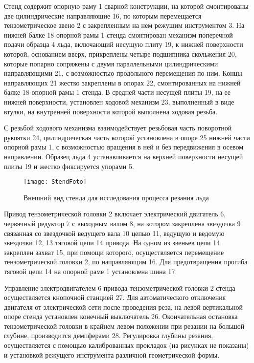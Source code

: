 Стенд содержит опорную раму 1 сварной конструкции, на которой смонтированы две цилиндрические направляющие 16, по которым перемещается тензометрическое звено 2 с закрепленным на нем режущим инструментом 3. На нижней балке 18 опорной рамы 1 стенда смонтирован механизм поперечной подачи образца 4 льда, включающий несущую плиту 19, к нижней поверхности которой, основанием вверх, прикреплены четыре подшипника скольжения 20, которые попарно сопряжены с двумя параллельными цилиндрическими направляющими 21, с возможностью продольного перемещения по ним. Концы направляющих 21 жестко закреплены в опорах 22, смонтированных на нижней балке 18 опорной рамы 1 стенда. В средней части несущей плиты 19, на ее нижней поверхности, установлен ходовой механизм 23, выполненный в виде втулки, на внутренней поверхности которой выполнена ходовая резьба.
 
С резьбой ходового механизма взаимодействует резьбовая часть поворотной рукоятки 24, цилиндрическая часть которой установлена в опоре 25 нижней части опорной рамы 1, с возможностью вращения в ней и без передвижения в осевом направлении. Образец льда 4 устанавливается на верхней поверхности несущей плиты 19 и жестко фиксируется упорами 5.

\begin{figure} [h]
	\center
	\texttt{[image: StendFoto]}
	\caption{Внешний вид стенда для исследования процесса резания льда} 
	\label{img:StendFoto}  
\end{figure}

Привод тензометрической головки 2 включает электрический двигатель 6, червячный редуктор 7 с выходным валом 8, на котором закреплена звездочка 9 связанная со звездочкой ведущего вала 10 цепью 11, ведущую и ведомую звездочки 12, 13 тяговой цепи 14 привода. На одном из звеньев цепи 14 закреплен захват 15, при помощи которого, осуществляется перемещение тензометрической головки 2, по направляющим 16. Для предотвращения прогиба тяговой цепи 14 на опорной раме 1 установлена шина 17.

Управление электродвигателем 6 привода тензометрической головки 2 стенда осуществляется кнопочной станцией 27. Для автоматического отключения двигателя от электрической сети после проведения реза, на левой вертикальной опоре стенда установлен конечный выключатель 26. Окончательная остановка тензометрической головки в крайнем левом положении при резании на большой глубине, производится демпферами 28. Регулировка глубины резания, осуществляется с помощью калиброванных прокладок (на рисунках не показаны) и установкой режущего инструмента различной геометрической формы.

